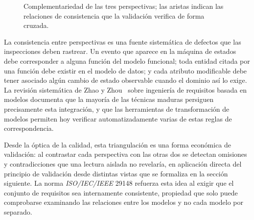 \documentclass[11pt,a4paper,oneside]{report}
\begin{document}
	\begin{figure}[htbp]
		\centering
		\caption{Complementariedad de las tres perspectivas; las aristas indican las relaciones de consistencia que la validaci\'on verifica de forma cruzada.}
		\label{fig:perspectivas}
	\end{figure}
	
	La consistencia entre perspectivas es una fuente sistem\'atica de defectos que las inspecciones deben rastrear. Un evento que aparece en la m\'aquina de estados debe corresponder a alguna funci\'on del modelo funcional; toda entidad citada por una funci\'on debe existir en el modelo de datos; y cada atributo modificable debe tener asociado alg\'un cambio de estado observable cuando el dominio as\'i lo exige. La revisi\'on sistem\'atica de Zhao y Zhou~\citep{zhao_mbre_2026} sobre ingenier\'ia de requisitos basada en modelos documenta que la mayor\'ia de las t\'ecnicas maduras persiguen precisamente esta integraci\'on, y que las herramientas de transformaci\'on de modelos permiten hoy verificar automatizadamente varias de estas reglas de correspondencia.
	
	Desde la \'optica de la calidad, esta triangulaci\'on es una forma econ\'omica de validaci\'on: al contrastar cada perspectiva con las otras dos se detectan omisiones y contradicciones que una lectura aislada no revelar\'ia, en aplicaci\'on directa del principio de validaci\'on desde distintas vistas que se formaliza en la secci\'on siguiente. La norma \textit{ISO/IEC/IEEE} 29148 \citep{iso29148_2018} refuerza esta idea al exigir que el conjunto de requisitos sea internamente consistente, propiedad que solo puede comprobarse examinando las relaciones entre los modelos y no cada modelo por separado.
	
\end{document}
